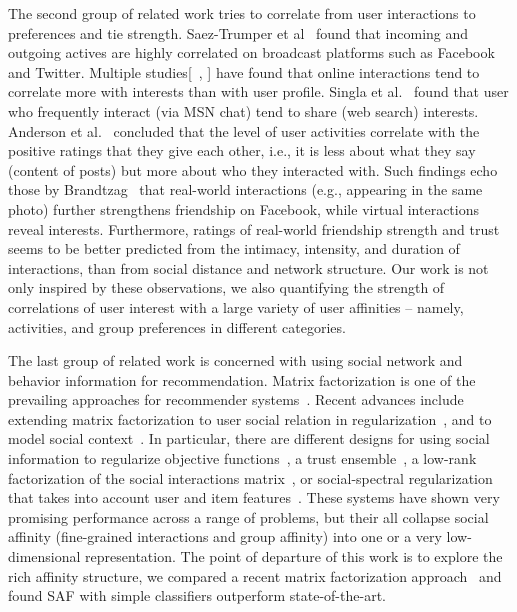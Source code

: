 The second group of related work tries to correlate from user interactions to preferences and tie strength. 
Saez-Trumper et al~\cite{saez2011high} found that incoming and outgoing actives are
highly correlated on broadcast platforms such as Facebook and Twitter.
Multiple studies[~\cite{singla2008yes}, ] have found that online interactions
tend to correlate more with interests than with user profile. Singla et al.~\cite{singla2008yes} found that user who frequently interact (via MSN chat) tend to share (web search) interests. 
Anderson et al.~\cite{Anderson2012} concluded that the level of user activities correlate with the positive ratings that they give each other, i.e., it is less about what they say (content of posts) but more about who they interacted with. Such findings echo those by Brandtzag~\cite{brandtzag2011facebook}
that real-world interactions (e.g., appearing in the same photo) further strengthens friendship on Facebook, while virtual interactions reveal interests. Furthermore, ratings of real-world friendship strength and trust~\cite{gilbert2009predicting} seems to be better predicted from the intimacy, intensity, and duration of interactions, than from social distance and network structure. 
Our work is not only inspired by these observations, we also quantifying the strength of correlations 
of user interest with a large variety of user affinities -- namely, activities, and group preferences in different categories.

The last group of related work is concerned with using social network and behavior information for recommendation. 
Matrix factorization is one of the prevailing approaches for recommender systems~\cite{koren2009matrix,sorec}.
Recent advances include extending matrix factorization to user social relation in regularization~\cite{sr,rrmf}, 
and to model social context~\cite{Jiang2012SCR}. 
In particular, there are different designs for using social information to regularize objective functions~\cite{lla}, a trust
ensemble~\cite{ste}, a low-rank factorization of the social
interactions matrix~\cite{sorec}, or social-spectral regularization that takes into account user and item features~\cite{Noel2012NOF}.  These systems have shown very promising performance across a range of problems, but their all collapse social affinity (fine-grained interactions and group affinity) into one or a very low-dimensional representation. The point of departure of this work is to explore the rich affinity structure, we compared a recent matrix factorization approach~\cite{Noel2012NOF} and found SAF with simple classifiers outperform state-of-the-art.

